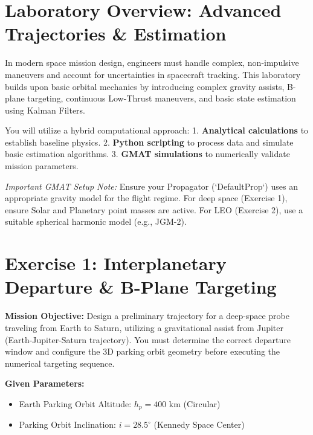 \documentclass[11pt, letterpaper]{article}
\begin{document}
\section*{Laboratory Overview: Advanced Trajectories \& Estimation}
In modern space mission design, engineers must handle complex, non-impulsive maneuvers and account for uncertainties in spacecraft tracking. This laboratory builds upon basic orbital mechanics by introducing complex gravity assists, B-plane targeting, continuous Low-Thrust maneuvers, and basic state estimation using Kalman Filters.

You will utilize a hybrid computational approach: 
1. \textbf{Analytical calculations} to establish baseline physics.
2. \textbf{Python scripting} to process data and simulate basic estimation algorithms.
3. \textbf{GMAT simulations} to numerically validate mission parameters.

\textit{Important GMAT Setup Note:} Ensure your Propagator (`DefaultProp`) uses an appropriate gravity model for the flight regime. For deep space (Exercise 1), ensure Solar and Planetary point masses are active. For LEO (Exercise 2), use a suitable spherical harmonic model (e.g., JGM-2).

\vspace{0.5cm}

\section*{Exercise 1: Interplanetary Departure \& B-Plane Targeting}
\textbf{Mission Objective:} Design a preliminary trajectory for a deep-space probe traveling from Earth to Saturn, utilizing a gravitational assist from Jupiter (Earth-Jupiter-Saturn trajectory). You must determine the correct departure window and configure the 3D parking orbit geometry before executing the numerical targeting sequence.

\textbf{Given Parameters:}
\begin{itemize}
    \item Earth Parking Orbit Altitude: $h_p = 400 \text{ km}$ (Circular)
    \item Parking Orbit Inclination: $i = 28.5^\circ$ (Kennedy Space Center)
\end{itemize}
\end{document}
